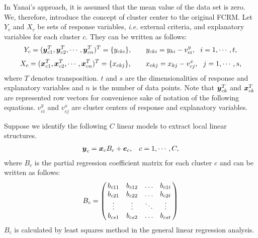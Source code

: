 \documentclass{article}
\newcommand{\vctr}[1]{\mbox{\boldmath $#1$}}
\begin{document}
In Yanai's approach, it is assumed that the mean value of the data set is zero. We, therefore, introduce the concept of cluster center to the original FCRM. Let $Y_c$ and $X_c$ be sets of response variables, {\it i.e.} external criteria, and explanatory variables for each cluster $c$. They can be written as follows:
%
\begin{eqnarray}
Y_c = ({\vctr y}^T_{c1}, {\vctr y}^T_{c2}, \cdots, {\vctr y}^T_{cn})^T = \{ y_{cki} \},  \qquad
y_{cki} = y_{ki} - v_{ci}^y, \ \ i = 1, \cdots, t,
\end{eqnarray}
%
\begin{eqnarray}
X_c = ({\vctr x}_{c1}^T, {\vctr x}_{c2}^T, \cdots, {\vctr x}_{cn}^T)^T = \{ x_{ckj} \},  \qquad
x_{ckj} = x_{kj} - v_{cj}^x, \ \ j = 1, \cdots, s,
\end{eqnarray}
%
where $T$ denotes transposition. $t$ and $s$ are the dimensionalities of response and explanatory variables and $n$ is the number of data points. Note that ${\vctr y}^T_{ck}$ and ${\vctr x}_{ck}^T$ are represented row vectors for convenience sake of notation of the following equations. $v_{ci}^y$ and $v_{cj}^x$ are cluster centers of response and explanatory variables.

Suppose we identify the following $C$ linear models to extract local linear structures.
%
\begin{eqnarray}
{\vctr y}_c = {\vctr x}_c B_c + {\vctr e}_c, \hspace{3mm} c=1, \cdots, C,
\end{eqnarray}
%
where $B_c$ is the partial regression coefficient matrix for each cluster $c$ and can be written as follows: 
%
\[B_c = \left(
\begin{array}{@{\,}cccc@{\,}}
b_{c11} & b_{c12} & \ldots & b_{c1t} \\
b_{c21} & b_{c22} & \ldots & b_{c2t} \\
\vdots & \vdots & \ddots & \vdots \\
b_{cs1} & b_{cs2} & \ldots & b_{cst} \\
\end{array}
\right) \]
%
$B_c$ is calculated by least squares method in the general linear regression analysis. 
\end{document}
